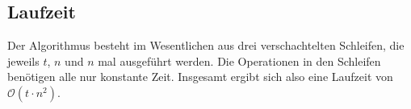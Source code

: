 \subsection{Laufzeit}
\label{sub:Laufzeit}

Der Algorithmus besteht im Wesentlichen aus drei verschachtelten Schleifen, die jeweils $t$, $n$ und $n$ mal ausgeführt werden. Die Operationen in den Schleifen benötigen alle nur konstante Zeit. Insgesamt ergibt sich also eine Laufzeit von $\mathcal{O}(t \cdot n^2)$.



